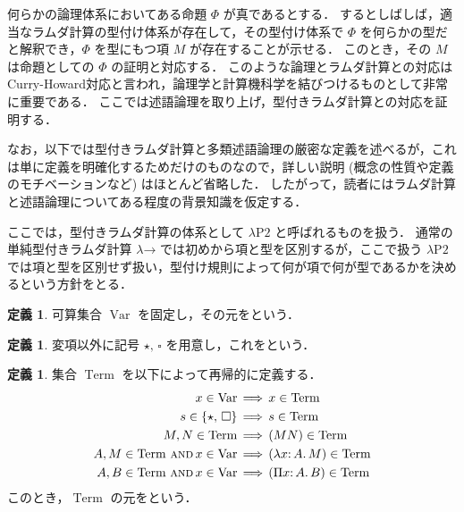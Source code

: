 \documentclass[./main]{subfiles}
\newcommand{\lam}{\lambda}
\newcommand{\ocl}{\mathord{:}}
\newcommand{\op}[1]{\mathop{\mathrm{#1}}\nolimits}
\newcommand{\typstar}{\mathord{\star}}
\newcommand{\typsq}{\mathord{\square}}
\newcommand{\textem}[1]{\textbf{\textgt{#1}}}
\newcommand{\fl}[1]{}
\newcommand{\ats}{\,}
\newcommand{\fwland}{\,\mathbin{\text{\textsc{and}}}\,}
\newcommand{\fLongrightarrow}{\,\Longrightarrow\,}
\theoremstyle{definition}
\newtheorem{defi}[theo]{定義}
\begin{document}


何らかの論理体系においてある命題 $ \varPhi $ が真であるとする．
するとしばしば，適当なラムダ計算の型付け体系が存在して，その型付け体系で $ \varPhi $ を何らかの型だと解釈でき，$ \varPhi $ を型にもつ項 $ M $ が存在することが示せる．
このとき，その $ M $ は命題としての $ \varPhi $ の証明と対応する．
このような論理とラムダ計算との対応はCurry-Howard対応と言われ，論理学と計算機科学を結びつけるものとして非常に重要である．
ここでは述語論理を取り上げ，型付きラムダ計算との対応を証明する．

なお，以下では型付きラムダ計算と多類述語論理の厳密な定義を述べるが，これは単に定義を明確化するためだけのものなので，詳しい説明 (概念の性質や定義のモチベーションなど) はほとんど省略した．
したがって，読者にはラムダ計算と述語論理についてある程度の背景知識を仮定する．


ここでは，型付きラムダ計算の体系として $ \lam \mathrm{P2} $ と呼ばれるものを扱う．
通常の単純型付きラムダ計算 $ \lam \mathord{\to} $ では初めから項と型を区別するが，ここで扱う $ \lam \mathrm{P2} $ では項と型を区別せず扱い，型付け規則によって何が項で何が型であるかを決めるという方針をとる．

\begin{defi}
可算集合 $ \op{Var} $ を固定し，その元を\textem{変項\fl{variable}}という．
\end{defi}

\begin{defi}
変項以外に記号 $ \typstar,\ats \typsq $ を用意し，これを\textem{ソート\fl{sort}}という．
\end{defi}

\begin{defi}
集合 $ \op{Term} $ を以下によって再帰的に定義する．
\begin{align*}
x \in \op{Var} & \fLongrightarrow x \in \op{Term} \\
s \in \{ \typstar,\ats \typsq \} & \fLongrightarrow s \in \op{Term} \\
M, N \in \op{Term} & \fLongrightarrow (MN) \in \op{Term} \\
A, M \in \op{Term} \fwland x \in \op{Var} & \fLongrightarrow (\lam x \ocl\, A.\, M) \in \op{Term} \\
A, B \in \op{Term} \fwland x \in \op{Var} & \fLongrightarrow (\Pi x \ocl\, A.\, B) \in \op{Term}
\end{align*}
このとき，$ \op{Term} $ の元を\textem{擬項\fl{pseudoterm}}という．
\end{defi}
\end{document}
